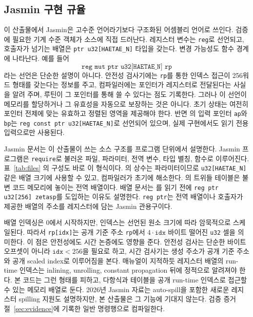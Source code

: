 \documentclass[10pt,twocolumn]{article}
\newcommand{\jasmin}{Jasmin}
\begin{document}
\subsection{\jasmin{} 구현 규율}

이 산출물에서 \jasmin{}은 고수준 언어라기보다 구조화된 어셈블리
언어로 쓰인다. 검증에 필요한 기계 수준 객체가 소스에 직접 드러난다.
레지스터 변수는 \texttt{reg}로 선언되고, 호출자가 넘기는 배열은
\texttt{ptr u32[HAETAE\_N]} 타입을 갖는다. 변경 가능성도 함수 경계에
나타난다. 예를 들어
\[
  \texttt{reg mut ptr u32[HAETAE\_N] rp}
\]
라는 선언은 단순한 설명이 아니다. 안전성 검사기에는
\texttt{rp}를 통한 인덱스 접근이 256워드 형태를 갖는다는 정보를 주고,
컴파일러에는 포인터가 레지스터로 전달된다는 사실을 알려 주며, 루틴이
그 포인터를 통해 쓸 수 있다는 점도 기록한다. 그러나 이 선언이 메모리를
할당하거나 그 유효성을 자동으로 보장하는 것은 아니다. 초기 상태는 여전히
포인터 전제에 맞는 유효하고 정렬된 영역을 제공해야 한다. 반면
의 입력 포인터
\texttt{ap}와 \texttt{bp}는 \texttt{reg const ptr u32[HAETAE\_N]}로
선언되어 있으며, 실제 구현에서도 읽기 전용 입력으로만 사용된다.

\jasmin{} 문서는 이 산출물이 쓰는 소스 구조를 프로그램 단위에서
설명한다. \jasmin{} 프로그램은 \texttt{require}로 불러온 파일,
파라미터, 전역 변수, 타입 별칭, 함수로 이루어진다. 표~\ref{tab:files}
의 구성도 바로 이 형식이다. 의 상수는 파라미터이므로
\texttt{u32[HAETAE\_N]} 같은 배열 크기에 사용할 수 있고, 컴파일러가
초기에 해소한다. 의 트위들 테이블은 불변 코드
메모리에 놓이는 전역 배열이다. 배열 문서는 를 읽기 전에
\texttt{reg ptr u32[256] zetasp}를 도입하는 이유도 설명한다.
\texttt{reg ptr}는 전역 배열이나 호출자가 제공한 배열의 주소를
레지스터에 담는 \jasmin{} 관용구이다.

배열 인덱싱은 0에서 시작하지만, 인덱스는 선언된 원소 크기에 따라
암묵적으로 스케일된다. 따라서 \texttt{rp[idx]}는 공개 기준 주소
\texttt{rp}에서 \(4\cdot\texttt{idx}\) 바이트 떨어진 \texttt{u32} 셀을
의미한다. 이 점은 안전성에도 시간 논증에도 영향을 준다. 안전성 검사는
단순한 바이트 오프셋이 아니라 \(\texttt{idx}<256\)을 필요로 하고,
시간 검사기는 생성 주소가 공개 기준 주소와 공개 scaled index로
이루어짐을 본다. 매뉴얼이 지적하듯 레지스터 배열의 run-time 인덱스는
inlining, unrolling, constant propagation 뒤에 정적으로 알려져야 한다.
본 코드는 그런 형태를 피하고, 다항식과 테이블을 공개 run-time 인덱스로
접근할 수 있는 메모리 배열로 둔다.
2026년 \jasmin{} 자료는 auto-spill을 포함한 새로운 레지스터 spilling
지원도 설명하지만, 본 산출물은 그 기능에 기대지 않는다. 검증 증거
절~\ref{sec:evidence}에 기록한 일반 명령행으로 컴파일한다.
\end{document}
